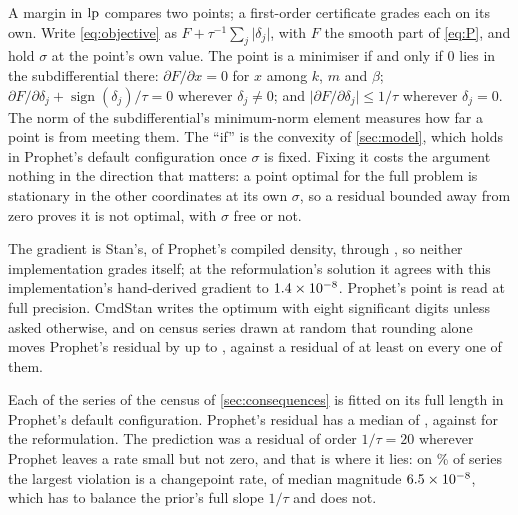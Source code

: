 A margin in $\mathrm{lp}$ compares two points; a first-order certificate grades each on
its own. Write \eqref{eq:objective} as $F + \tau^{-1}\sum_j\lvert\delta_j\rvert$,
with $F$ the smooth part of \eqref{eq:P}, and hold $\sigma$ at the point's own value.
The point is a minimiser if and only if $0$ lies in the subdifferential there:
$\partial F/\partial x = 0$ for $x$ among $k$, $m$ and $\beta$;
$\partial F/\partial\delta_j + \operatorname{sign}(\delta_j)/\tau = 0$ wherever
$\delta_j \ne 0$; and $\lvert\partial F/\partial\delta_j\rvert \le 1/\tau$ wherever
$\delta_j = 0$. The norm of the subdifferential's minimum-norm element measures how far
a point is from meeting them. The ``if'' is the convexity of \cref{sec:model}, which
holds in Prophet's default configuration once $\sigma$ is fixed. Fixing it costs the
argument nothing in the direction that matters: a point optimal for the full problem
is stationary in the other coordinates at its own $\sigma$, so a residual bounded
away from zero proves it is not optimal, with $\sigma$ free or not.

The gradient is Stan's, of Prophet's compiled density, through
, so neither implementation grades itself; at the
reformulation's solution it agrees with this implementation's hand-derived gradient
to $1.4\times10^{-8}$. Prophet's point is read at full precision. CmdStan writes the optimum
with eight significant digits unless asked otherwise, and on \KktRoundingSeries{}
census series drawn at random that rounding alone moves Prophet's residual by up to
\KktRoundingMax, against a residual of at least \KktRoundingResidualMin{} on every one of
them.

Each of the \KktSeries{} series of the census of \cref{sec:consequences} is fitted on
its full length in Prophet's default configuration. Prophet's residual has a median
of \KktProphetStrict{}, against \KktOursMedian{} for the reformulation. The prediction
was a residual of order $1/\tau = 20$ wherever Prophet leaves a rate small but not
zero, and that is where it lies: on \KktStrictAtRate\% of series the largest violation
is a changepoint rate, of median magnitude $6.5\times10^{-8}$, which has to balance the
prior's full slope $1/\tau$ and does not.

